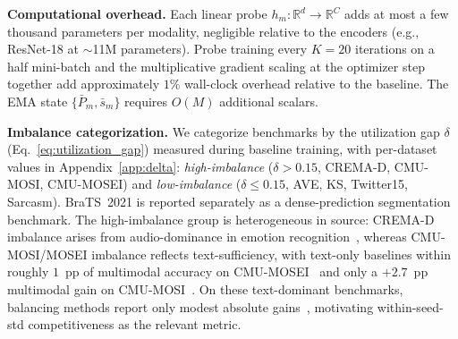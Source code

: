 \documentclass{article} %
\newcommand{\probe}{h}
\begin{document}
\textbf{Computational overhead.} Each linear probe $\probe_m\colon \mathbb{R}^d \to \mathbb{R}^C$ adds at most a few thousand parameters per modality, negligible relative to the encoders (e.g., ResNet-18 at $\sim$11M parameters). Probe training every $K{=}20$ iterations on a half mini-batch and the multiplicative gradient scaling at the optimizer step together add approximately $1\%$ wall-clock overhead relative to the baseline. The EMA state $\{\bar{P}_m, \bar{s}_m\}$ requires $O(M)$ additional scalars.

\textbf{Imbalance categorization.}
\label{sec:imbalance_cat}
We categorize benchmarks by the utilization gap $\delta$ (Eq.~\eqref{eq:utilization_gap}) measured during baseline training, with per-dataset values in Appendix~\ref{app:delta}: \emph{high-imbalance} ($\delta > 0.15$, CREMA-D, CMU-MOSI, CMU-MOSEI) and \emph{low-imbalance} ($\delta \leq 0.15$, AVE, KS, Twitter15, Sarcasm). BraTS~2021 is reported separately as a dense-prediction segmentation benchmark. The high-imbalance group is heterogeneous in source: CREMA-D imbalance arises from audio-dominance in emotion recognition~\citep{peng2022ogmge}, whereas CMU-MOSI/MOSEI imbalance reflects text-sufficiency, with text-only baselines within roughly $1$~pp of multimodal accuracy on CMU-MOSEI~\citep{li2023agm} and only a $+2.7$~pp multimodal gain on CMU-MOSI~\citep{wei2025dgl}. On these text-dominant benchmarks, balancing methods report only modest absolute gains~\citep{guo2024cggm,wei2024opm}, motivating within-seed-std competitiveness as the relevant metric.
\end{document}
